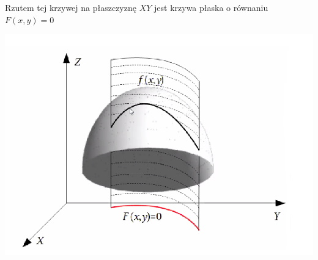Rzutem tej krzywej na płaszczyznę $XY$ jest krzywa płaska o równaniu $F(x,y) = 0$

\begin{center}
\includegraphics[scale=0.4]{img/rzut_plaszczyznaXY.png}
\end{center}

